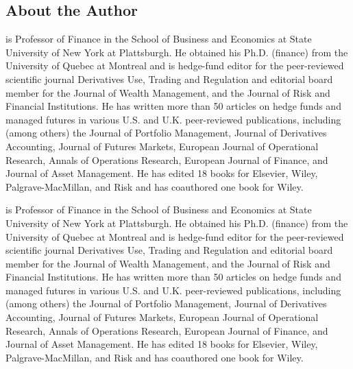 \begin{frontchapter}

\begin{frontmatter}
\chapter*{About the Author}
\makechaptertitle
\end{frontmatter}



\begin{contributors}
\author{Greg N. Gregoriou}{is Professor of Finance in the School of Business and Economics at State University of New York at Plattsburgh. He obtained his Ph.D. (finance) from
the University of Quebec at Montreal and is hedge-fund editor for
the peer-reviewed scientific journal Derivatives Use, Trading and
Regulation and editorial board member for the Journal of Wealth
Management, and the Journal of Risk and Financial Institutions. He
has written more than 50 articles on hedge funds and managed futures
in various U.S. and U.K. peer-reviewed publications, including
(among others) the Journal of Portfolio Management, Journal of
Derivatives Accounting, Journal of Futures Markets, European Journal
of Operational Research, Annals of Operations Research, European
Journal of Finance, and Journal of Asset Management. He has edited
18 books for Elsevier, Wiley, Palgrave-MacMillan, and Risk and has
coauthored one book for \nobreak Wiley.}
\author{Greg N. Gregoriou}{is Professor of Finance in the School of Business and Economics at State University of New York at Plattsburgh. He obtained his Ph.D. (finance) from
the University of Quebec at Montreal and is hedge-fund editor for
the peer-reviewed scientific journal Derivatives Use, Trading and
Regulation and editorial board member for the Journal of Wealth
Management, and the Journal of Risk and Financial Institutions. He
has written more than 50 articles on hedge funds and managed futures
in various U.S. and U.K. peer-reviewed publications, including
(among others) the Journal of Portfolio Management, Journal of
Derivatives Accounting, Journal of Futures Markets, European Journal
of Operational Research, Annals of Operations Research, European
Journal of Finance, and Journal of Asset Management. He has edited
18 books for Elsevier, Wiley, Palgrave-MacMillan, and Risk and has
coauthored one book for \nobreak Wiley.}

\end{contributors}

\end{frontchapter}
